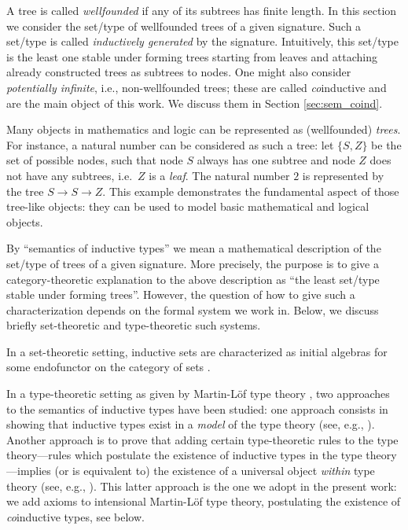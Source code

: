 \documentclass[a4paper,USenglish]{lipics}
\newcommand{\parencite}[1]{\cite{#1}}
\begin{document}
 A tree is called \emph{wellfounded} if any of its subtrees has finite length. In this section we consider the set/type of wellfounded trees of 
 a given signature. Such a set/type is called \emph{inductively generated} by the signature. Intuitively, this set/type is the least one stable under
 forming trees starting from leaves and attaching already constructed trees as subtrees to nodes.
 One might also consider \emph{potentially infinite}, i.e., non-wellfounded trees; these are called \emph{co}inductive and are the main object of this work.
 We discuss them in Section \ref{sec:sem_coind}.
 
 
 Many objects in mathematics and logic can be represented as (wellfounded) \emph{trees}.
 For instance, a natural number can be considered as such a tree: let $\{S,Z\}$ be the set of possible nodes, 
 such that node $S$ always has one subtree and node $Z$ does not have any subtrees, i.e.\ $Z$ is a \emph{leaf}.
 The natural number $2$ is represented by the tree $S\longrightarrow S\longrightarrow Z$. 
 This example demonstrates the fundamental aspect of those tree-like objects: they can be used to model basic mathematical and logical objects.
 
  
 By \enquote{semantics of inductive types} we mean a mathematical description of the set/type of trees of a given signature. 
 More precisely, the purpose is to give a category-theoretic explanation to the above description as \enquote{the least set/type stable under forming trees}.
 However, the question of how to give such a characterization depends on the formal system we work in. 
 Below, we discuss briefly set-theoretic and type-theoretic such systems.
 
 In a set-theoretic setting, inductive sets are characterized as initial algebras for 
 some endofunctor on the category of sets \parencite{jacobs1997tutorial}.
 
 In a type-theoretic setting as given by Martin-L\"of type theory \parencite{martin_lof}, 
 two approaches to the semantics of inductive types have been studied: 
 one approach consists in showing that inductive types exist in a \emph{model} of the type theory
 (see, e.g., \cite{DBLP:journals/apal/MoerdijkP00}).
 Another approach is to prove that adding certain type-theoretic rules to the type theory---rules which postulate the existence
 of inductive types in the type theory---implies (or is equivalent to) the existence of a universal object \emph{within} type theory
 (see, e.g., \parencite{DBLP:conf/lics/AwodeyGS12, DBLP:journals/tcs/Dybjer97}).
 This latter approach is the one we adopt in the present work: we add axioms to intensional Martin-Löf type theory,
 postulating the existence of \emph{co}inductive types, see below.
 
\end{document}
